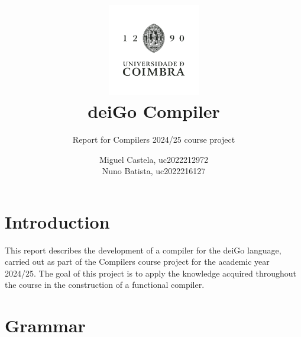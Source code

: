 \documentclass[12pt]{article}
\title{
    \vspace{-2em} %
    \includegraphics[width=0.3\textwidth]{UC.png} \\ 
    deiGo Compiler}
\subtitle{Report for Compilers 2024/25 course project}
\author{
Miguel Castela, uc2022212972 \\
Nuno Batista, uc2022216127}
\date{} %
\date{}
\begin{document}
\maketitle

\newpage

\section{Introduction}
This report describes the development of a compiler for the deiGo language, carried out as part of the Compilers course project for the academic year 2024/25. The goal of this project is to apply the knowledge acquired throughout the course in the construction of a functional compiler.

\section{Grammar}
    
\end{document}

